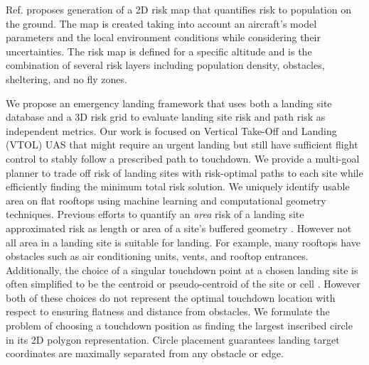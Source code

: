 Ref. \cite{primatesta_ground_2020} proposes generation of a 2D risk map that quantifies  risk to population on the ground. The map is created taking into account an aircraft's model parameters and the local environment conditions while considering their uncertainties. The risk map is defined for a specific altitude and is the combination of several risk layers including population density, obstacles, sheltering, and no fly zones.

We propose an emergency landing framework that uses both a landing site database and a 3D risk grid to evaluate landing site risk and path risk as independent metrics. Our work is focused on Vertical Take-Off and Landing (VTOL) \ac{UAS} that might require an urgent landing but still have sufficient flight control to stably follow a prescribed path to touchdown. We provide a  multi-goal planner to trade off risk of landing sites with risk-optimal paths to each site while efficiently finding the minimum total risk solution. We uniquely identify usable area on flat rooftops using machine learning and computational geometry techniques. Previous efforts to quantify an \emph{area} risk of a landing site approximated risk as length or area of a site's buffered geometry \cite{di_donato_evaluating_2017}. However not all area in a landing site is suitable for landing. For example, many rooftops have obstacles such as air conditioning units, vents, and rooftop entrances. Additionally, the choice of a singular touchdown point at a chosen landing site is often simplified to be the centroid or pseudo-centroid of the site or cell \cite{di_donato_evaluating_2017, mejias_alvarez_forced_2009}. However both of these choices do not represent the optimal touchdown location with respect to ensuring flatness and distance from obstacles. We formulate the problem of choosing a touchdown position as finding the largest inscribed circle in its 2D polygon representation. Circle placement guarantees landing target coordinates are maximally separated from any obstacle or edge. 




